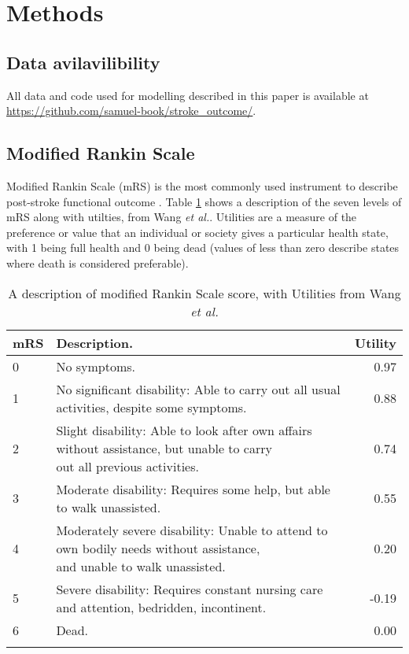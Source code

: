 \section{Methods}

\subsection{Data avilavilibility}

All data and code used for modelling described in this paper is available at \url{https://github.com/samuel-book/stroke_outcome/}.

\subsection{Modified Rankin Scale}

Modified Rankin Scale (mRS) is the most commonly used instrument to describe post-stroke functional outcome \cite{quinn_functional_2009}. Table \ref{tab:mrs} shows a description of the seven levels of mRS along with utilties, from Wang \emph{et al.}\cite{wang_utility-weighted_2020}. Utilities are a measure of the preference or value that an individual or society gives a particular health state, with 1 being full health and 0 being dead (values of less than zero describe states where death is considered preferable).



\renewcommand*{\arraystretch}{1.5} %

\begin{longtable}[]{@{}llr@{}}
\caption{A description of modified Rankin Scale score, with Utilities from Wang \emph{et al.}\cite{wang_utility-weighted_2020}}\\
\toprule
mRS & Description. & Utility\tabularnewline
\midrule
\endhead
0 & No symptoms. & 0.97\tabularnewline
1 & No significant disability: Able to carry out all usual activities,
despite some symptoms. & 0.88\tabularnewline
2 & \makecell[l]{Slight disability: Able to look after own affairs without assistance, but unable to carry \\ out all previous activities.} &
0.74\tabularnewline
3 & Moderate disability: Requires some help, but able to walk
unassisted. & 0.55\tabularnewline
4 & \makecell[l]{Moderately severe disability: Unable to attend to own bodily needs without assistance, \\ and unable to walk unassisted.} & 0.20\tabularnewline
5 & Severe disability: Requires constant nursing care and attention,
bedridden, incontinent. & -0.19\tabularnewline
6 & Dead. & 0.00\tabularnewline
\bottomrule
\label{tab:mrs}
\end{longtable}



